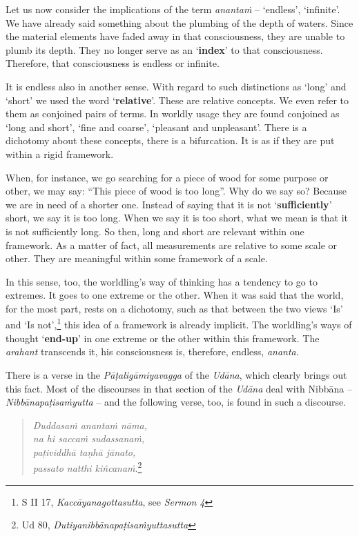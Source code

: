Let us now consider the implications of the term \emph{anantaṁ} -- `endless', `infinite'. We have already said something about the plumbing of the depth of waters. Since the material elements have faded away in that consciousness, they are unable to plumb its depth. They no longer serve as an `\textbf{index}' to that consciousness. Therefore, that consciousness is endless or infinite.

It is endless also in another sense. With regard to such distinctions as `long' and `short' we used the word `\textbf{relative}'. These are relative concepts. We even refer to them as conjoined pairs of terms. In worldly usage they are found conjoined as `long and short', `fine and coarse', `pleasant and unpleasant'. There is a dichotomy about these concepts, there is a bifurcation. It is as if they are put within a rigid framework.

When, for instance, we go searching for a piece of wood for some purpose or other, we may say: ``This piece of wood is too long''. Why do we say so? Because we are in need of a shorter one. Instead of saying that it is not `\textbf{sufficiently}' short, we say it is too long. When we say it is too short, what we mean is that it is not sufficiently long. So then, long and short are relevant within one framework. As a matter of fact, all measurements are relative to some scale or other. They are meaningful within some framework of a scale.

In this sense, too, the worldling's way of thinking has a tendency to go to extremes. It goes to one extreme or the other. When it was said that the world, for the most part, rests on a dichotomy, such as that between the two views `Is' and `Is not',\footnote{S II 17, \emph{Kaccāyanagottasutta}, see \emph{Sermon 4}} this idea of a framework is already implicit. The worldling's ways of thought `\textbf{end-up}' in one extreme or the other within this framework. The \emph{arahant} transcends it, his consciousness is, therefore, endless, \emph{ananta}.

There is a verse in the \emph{Pāṭaligāmiyavagga} of the \emph{Udāna}, which clearly brings out this fact. Most of the discourses in that section of the \emph{Udāna} deal with Nibbāna -- \emph{Nibbānapaṭisaṁyutta} -- and the following verse, too, is found in such a discourse.

\begin{quote}
\emph{Duddasaṁ anantaṁ nāma,}\\
\emph{na hi saccaṁ sudassanaṁ,}\\
\emph{paṭividdhā taṇhā jānato,}\\
\emph{passato natthi kiñcanaṁ}.\footnote{Ud 80, \emph{Dutiyanibbānapaṭisaṁyuttasutta}}
\end{quote}

